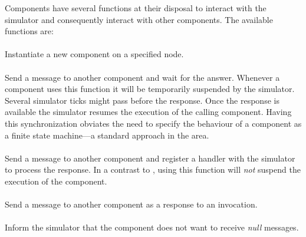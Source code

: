 

Components have several functions at their disposal to interact with the simulator and consequently interact with other components.
The available functions are:

\paragraph{}
Instantiate a new component on a specified node.
\paragraph{}
Send a message to another component and wait for the answer.
Whenever a component uses this function it will be temporarily suspended by the simulator.
Several simulator ticks might pass before the response.
Once the response is available the simulator resumes the execution of the calling component.
Having this synchronization obviates the need to specify the behaviour of a component as a finite state machine---a standard approach in the area.
\paragraph{}
Send a message to another component and register a handler with the simulator to process the response.
In a contrast to , using this function will \emph{not} suspend the execution of the component.
\paragraph{}
Send a message to another component as a response to an invocation.
\paragraph{}
Inform the simulator that the component does not want to receive \emph{null} messages.
